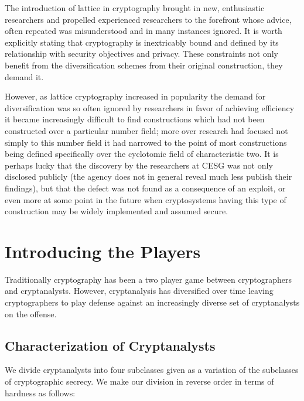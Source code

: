 The introduction of lattice in cryptography brought in new,
enthusiastic researchers and propelled experienced researchers to the
forefront whose advice, often repeated was misunderstood and in many
instances ignored.
It is worth explicitly stating that cryptography is inextricably bound and
defined by its relationship with security objectives and privacy. These
constraints not only benefit from the diversification schemes from
their original construction, they demand it.

However, as lattice cryptography increased in popularity the demand
for diversification was so often ignored by researchers in favor of
achieving efficiency it became increasingly difficult to find
constructions which had not been constructed over a particular number
field; more over research had focused not simply to this number field
it had narrowed to the point of most constructions being defined
specifically over the cyclotomic field of characteristic two.
It is perhaps lucky that the discovery by the researchers at CESG was
not only disclosed publicly (the agency does not in general reveal much
less publish their findings), but that the defect was not found as a
consequence of an exploit, or even more at some point in the future
when cryptosystems having this type of construction may be widely
implemented and assumed secure.

\section{Introducing the Players}

Traditionally cryptography has been a two player game between
cryptographers and cryptanalysts. However, cryptanalysis has
diversified over time leaving cryptographers to play defense against an
increasingly diverse set of cryptanalysts on the offense.

\subsection{Characterization of Cryptanalysts}

We divide cryptanalysts into four subclasses given as a variation of
the subclasses of cryptographic secrecy.
We make our division in reverse order in terms of hardness as
follows:

